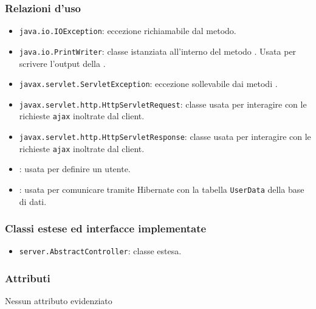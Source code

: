 \subsubsection*{Relazioni d'uso}
\begin{itemize}
\item \texttt{java.io.IOException}: eccezione richiamabile dal metodo.
	\item \texttt{java.io.PrintWriter}: classe istanziata all'interno del metodo . Usata per scrivere l'output della .
	\item \texttt{javax.servlet.ServletException}: eccezione sollevabile dai metodi .
	\item \texttt{javax.servlet.http.HttpServletRequest}: classe usata per interagire con le richieste \texttt{ajax} inoltrate dal client.
	\item \texttt{javax.servlet.http.HttpServletResponse}: classe usata per interagire con le richieste \texttt{ajax} inoltrate dal client.
	\item {}: usata per definire un utente.
	\item {}: usata per comunicare tramite Hibernate con la tabella \texttt{UserData} della base di dati.
\end{itemize}

\subsubsection*{Classi estese ed interfacce implementate}
\begin{itemize}
	\item \texttt{server.AbstractController}: classe estesa.
\end{itemize}

\subsubsection*{Attributi}

Nessun attributo evidenziato

